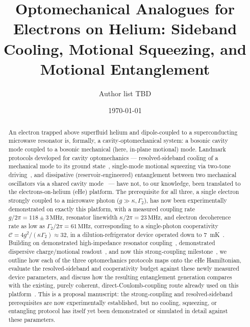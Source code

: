 \documentclass[aps,prapplied,reprint,superscriptaddress,longbibliography]{revtex4-2}
\begin{document}
\title{Optomechanical Analogues for Electrons on Helium: Sideband Cooling, Motional Squeezing, and
Motional Entanglement}

\author{Author list TBD}

\date{\today}

\begin{abstract}
An electron trapped above superfluid helium and dipole-coupled to a superconducting microwave
resonator is, formally, a cavity-optomechanical system: a bosonic cavity mode coupled to a bosonic
mechanical (here, in-plane motional) mode. Landmark protocols developed for cavity optomechanics —
resolved-sideband cooling of a mechanical mode to its ground
state~\cite{teufel2011sideband}, single-mode motional squeezing via two-tone
driving~\cite{pirkkalainen2015squeezing}, and dissipative (reservoir-engineered) entanglement between
two mechanical oscillators via a shared cavity mode~\cite{ockeloenkorppi2018stabilized} — have not,
to our knowledge, been translated to the electrons-on-helium (eHe) platform. The prerequisite for all
three, a single electron strongly coupled to a microwave photon ($g \gg \kappa,\Gamma_2$), has now
been experimentally demonstrated on exactly this platform, with a measured coupling rate
$g/2\pi = 118\pm3\,\mathrm{MHz}$, resonator linewidth $\kappa/2\pi = 23\,\mathrm{MHz}$, and electron
decoherence rate as low as $\Gamma_2/2\pi = 61\,\mathrm{MHz}$, corresponding to a single-photon
cooperativity $\mathcal{C} = 4g^2/(\kappa\Gamma_2) \approx 32$, in a dilution-refrigerator device
operated down to 7~mK~\cite{koolstra2026strong}. Building on demonstrated high-impedance resonator
coupling~\cite{koolstra2025impedance}, demonstrated dispersive charge/motional
readout~\cite{castoria2025}, and now this strong-coupling milestone~\cite{koolstra2026strong}, we
outline how each of the three optomechanics protocols maps onto the eHe Hamiltonian, evaluate the
resolved-sideband and cooperativity budget against these newly measured device parameters, and
discuss how the resulting entanglement generation compares with the existing, purely coherent,
direct-Coulomb-coupling route already used on this platform~\cite{beysengulov2024}. This is a
proposal manuscript: the strong-coupling and resolved-sideband prerequisites are now experimentally
established, but no cooling, squeezing, or entangling protocol has itself yet been demonstrated or
simulated in detail against these parameters.
\end{abstract}
\end{document}
